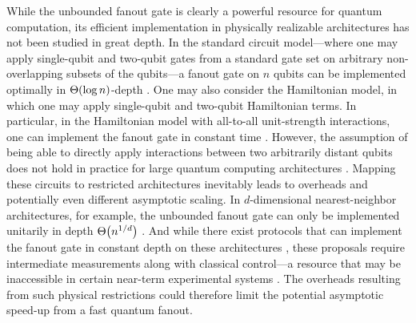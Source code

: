 While the unbounded fanout gate is clearly a powerful resource for quantum computation, its efficient implementation in physically realizable architectures has not been studied in great depth.
In the standard circuit model---where one may apply single-qubit and two-qubit gates from a standard gate set on arbitrary non-overlapping subsets of the qubits---a fanout gate on $n$ qubits can be implemented optimally in $\Th{\log{n}}$-depth \cite{bigO,Broadbent2009a}.
One may also consider the Hamiltonian model, in which one may apply single-qubit and two-qubit Hamiltonian terms.
In particular, in the Hamiltonian model with all-to-all unit-strength interactions, one can implement the fanout gate in constant time \cite{Fenner2003,Fenner2004}.
However, the assumption of being able to directly apply interactions between two arbitrarily distant qubits does not hold in practice for large quantum computing architectures \cite{Monroe2014,Linke2017,Bapat2018,Childs2019c}.
Mapping these circuits to restricted architectures inevitably leads to overheads and potentially even different asymptotic scaling.
In $d$-dimensional nearest-neighbor architectures, for example, the unbounded fanout gate can only be implemented unitarily in depth $\Th{n^{1/d}}$ \cite{Rosenbaum2013}.
And while there exist protocols that can implement the fanout gate in constant depth on these architectures \cite{Pham2013}, these proposals require intermediate measurements along with classical control---a resource that may be inaccessible in certain near-term experimental systems \cite{Arute2019}.
The overheads resulting from such physical restrictions could therefore limit the potential asymptotic speed-up from a fast quantum fanout.

